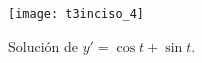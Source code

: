 \begin{figure}[!hbt]
\centering
  \texttt{[image: t3inciso\_4]}
	\caption{Solución de $y'=\cos{t}+\sin{t}$.}%
	\label{fig:i4}
\end{figure}
